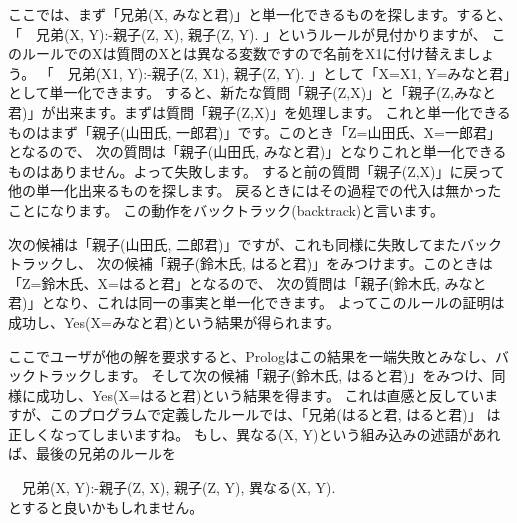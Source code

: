 \documentclass[a4j,dvipdfmx]{jsarticle}
\newcommand{\fixed}[1]{{\ttfamily #1}}
\begin{document}
ここでは、まず「兄弟(X, みなと君)」と単一化できるものを探します。すると、
「{\fixed 　兄弟(X, Y):-親子(Z, X), 親子(Z, Y). }」というルールが見付かりますが、
このルールでのXは質問のXとは異なる変数ですので名前をX1に付け替えましょう。
「{\fixed 　兄弟(X1, Y):-親子(Z, X1), 親子(Z, Y). }」として「X=X1, Y=みなと君」として単一化できます。
すると、新たな質問「親子(Z,X)」と「親子(Z,みなと君)」が出来ます。まずは質問「親子(Z,X)」を処理します。
これと単一化できるものはまず「親子(山田氏, 一郎君)」です。このとき「Z=山田氏、X=一郎君」となるので、
次の質問は「親子(山田氏, みなと君)」となりこれと単一化できるものはありません。よって失敗します。
すると前の質問「親子(Z,X)」に戻って他の単一化出来るものを探します。
戻るときにはその過程での代入は無かったことになります。
この動作をバックトラック(backtrack)と言います。

次の候補は「親子(山田氏, 二郎君)」ですが、これも同様に失敗してまたバックトラックし、
次の候補「親子(鈴木氏, はると君)」をみつけます。このときは「Z=鈴木氏、X=はると君」となるので、
次の質問は「親子(鈴木氏, みなと君)」となり、これは同一の事実と単一化できます。
よってこのルールの証明は成功し、Yes(X=みなと君)という結果が得られます。

ここでユーザが他の解を要求すると、Prologはこの結果を一端失敗とみなし、バックトラックします。
そして次の候補「親子(鈴木氏, はると君)」をみつけ、同様に成功し、Yes(X=はると君)という結果を得ます。
これは直感と反していますが、このプログラムで定義したルールでは、「兄弟(はると君, はると君)」
は正しくなってしまいますね。
もし、異なる(X, Y)という組み込みの述語があれば、最後の兄弟のルールを

{\fixed 　兄弟(X, Y):-親子(Z, X), 親子(Z, Y), 異なる(X, Y). } \\

とすると良いかもしれません。
\end{document}
